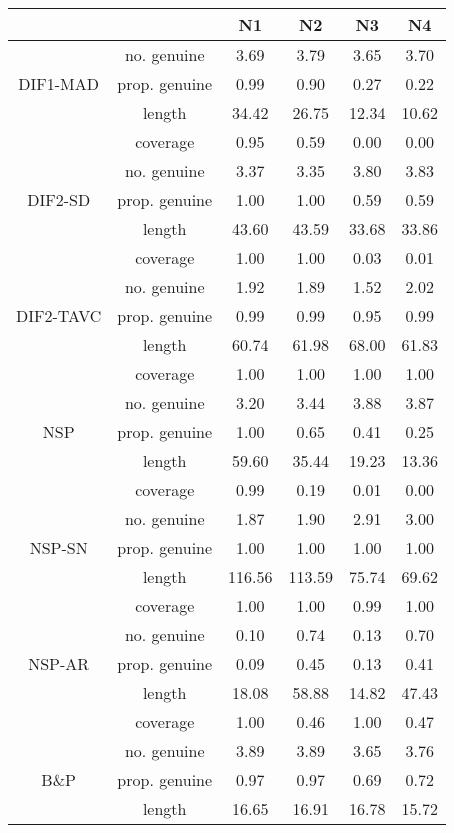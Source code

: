 \begin{tabular}{|c|c|c|c|c|c|}
  \hline
 &  & N1 & N2 & N3 & N4 \\ 
  \hline
 & no. genuine & 3.69 & 3.79 & 3.65 & 3.70 \\ 
  DIF1-MAD & prop. genuine & 0.99 & 0.90 & 0.27 & 0.22 \\ 
   & length & 34.42 & 26.75 & 12.34 & 10.62 \\ 
   & coverage & 0.95 & 0.59 & 0.00 & 0.00 \\ 
   & no. genuine & 3.37 & 3.35 & 3.80 & 3.83 \\ 
  DIF2-SD & prop. genuine & 1.00 & 1.00 & 0.59 & 0.59 \\ 
   & length & 43.60 & 43.59 & 33.68 & 33.86 \\ 
   & coverage & 1.00 & 1.00 & 0.03 & 0.01 \\ 
   & no. genuine & 1.92 & 1.89 & 1.52 & 2.02 \\ 
  DIF2-TAVC & prop. genuine & 0.99 & 0.99 & 0.95 & 0.99 \\ 
   & length & 60.74 & 61.98 & 68.00 & 61.83 \\ 
   & coverage & 1.00 & 1.00 & 1.00 & 1.00 \\ 
   & no. genuine & 3.20 & 3.44 & 3.88 & 3.87 \\ 
  NSP & prop. genuine & 1.00 & 0.65 & 0.41 & 0.25 \\ 
   & length & 59.60 & 35.44 & 19.23 & 13.36 \\ 
   & coverage & 0.99 & 0.19 & 0.01 & 0.00 \\ 
   & no. genuine & 1.87 & 1.90 & 2.91 & 3.00 \\ 
  NSP-SN & prop. genuine & 1.00 & 1.00 & 1.00 & 1.00 \\ 
   & length & 116.56 & 113.59 & 75.74 & 69.62 \\ 
   & coverage & 1.00 & 1.00 & 0.99 & 1.00 \\ 
   & no. genuine & 0.10 & 0.74 & 0.13 & 0.70 \\ 
  NSP-AR & prop. genuine & 0.09 & 0.45 & 0.13 & 0.41 \\ 
   & length & 18.08 & 58.88 & 14.82 & 47.43 \\ 
   & coverage & 1.00 & 0.46 & 1.00 & 0.47 \\ 
   & no. genuine & 3.89 & 3.89 & 3.65 & 3.76 \\ 
  B\&P & prop. genuine & 0.97 & 0.97 & 0.69 & 0.72 \\ 
   & length & 16.65 & 16.91 & 16.78 & 15.72 \\ 

\end{tabular}

